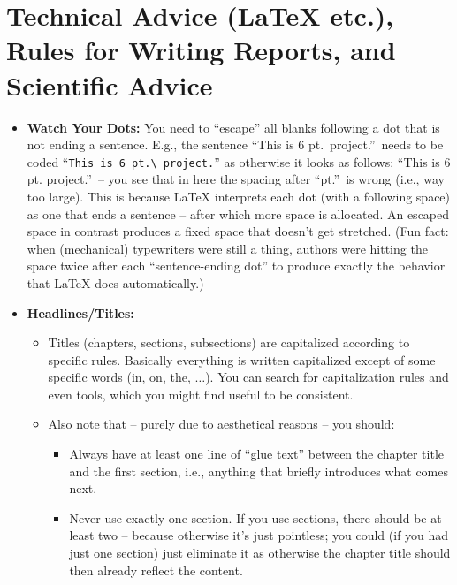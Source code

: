 \section[Technical Advice for Writing Your Report]{Technical Advice (\LaTeX{} etc.), Rules for Writing Reports, and Scientific Advice}

\begin{itemize}
  \item \textbf{Watch Your Dots:} You need to ``escape'' all blanks following a dot that is not ending a sentence. E.g., the sentence ``This is 6 pt.\ project.''\ needs to be coded ``\verb!This is 6 pt.\ project.!'' as otherwise it looks as follows: ``This is 6 pt. project.''\ -- you see that in here the spacing after ``pt.''\ is wrong (i.e., way too large). This is because \LaTeX{} interprets each dot (with a following space) as one that ends a sentence -- after which more space is allocated. An escaped space in contrast produces a fixed space that doesn't get stretched. (Fun fact: when (mechanical) typewriters were still a thing, authors were hitting the space twice after each ``sentence-ending dot'' to produce exactly the behavior that \LaTeX{} does automatically.)
  
  \item \textbf{Headlines/Titles:}
  \begin{itemize}
    \item Titles (chapters, sections, subsections) are capitalized according to specific rules. Basically everything is written capitalized except of some specific words (in, on, the, $\dots$). You can search for capitalization rules and even tools, which you might find useful to be consistent.
    \item Also note that -- purely due to aesthetical reasons -- you should:
      \begin{itemize}
        \item Always have at least one line of ``glue text'' between the chapter title and the first section, i.e., anything that briefly introduces what comes next.
        \item Never use exactly one section. If you use sections, there should be at least two -- because otherwise it's just pointless; you could (if you had just one section) just eliminate it as otherwise the chapter title should then already reflect the content.
      \end{itemize}
  \end{itemize}



\end{itemize}
